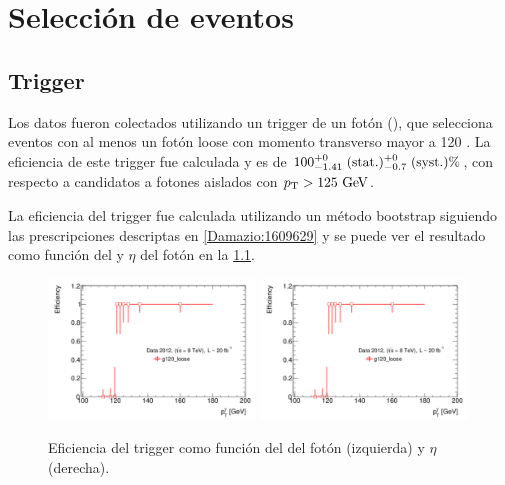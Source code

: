 \chapter{Selección de eventos}\label{cap:seleccion}

\section{Trigger}\label{sec:trigger}

Los datos fueron colectados utilizando un trigger de un fotón (\trigchain),
que selecciona eventos con al menos un fotón loose con momento transverso mayor
a 120 \gev.
La eficiencia de este trigger fue calculada y es de $100^{+0}_{-1.41}\mbox{$\;$(stat.)}{}^{+0}_{-0.7}\mbox{$\;$(syst.)} \%$,
con respecto a candidatos a fotones aislados con $\pt>125 \gev$.

La eficiencia del trigger fue calculada utilizando un método bootstrap siguiendo las prescripciones
descriptas en \cref{Damazio:1609629} y se puede ver el resultado como función del {\pt} y $\eta$ del
fotón en la \cref{fig:trigger_perf}.

\begin{figure}[h!]
  \centering
  \includegraphics[width=0.49\textwidth]{figures/EffPtg120_loose}
  \includegraphics[width=0.49\textwidth]{figures/EffPtg120_loose}
  \caption{Eficiencia del trigger {\trigchain} como función del {\pt} del fotón (izquierda)
    y $\eta$ (derecha).}
  \label{fig:trigger_perf}
\end{figure}

